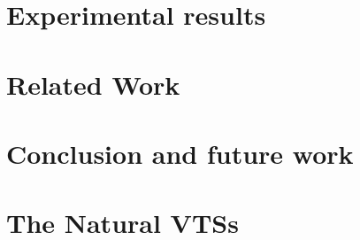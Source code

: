 \documentclass[]{llncs}
\begin{document}
\section{Experimental results}
\label{sec:experiments}


\section{Related Work}
\label{sec:related}


\section{Conclusion and future work}
\label{sec:conclusion}





\appendix
\clearpage

\section{The Natural VTSs}
\label{sec:ex-vts}

\end{document}
